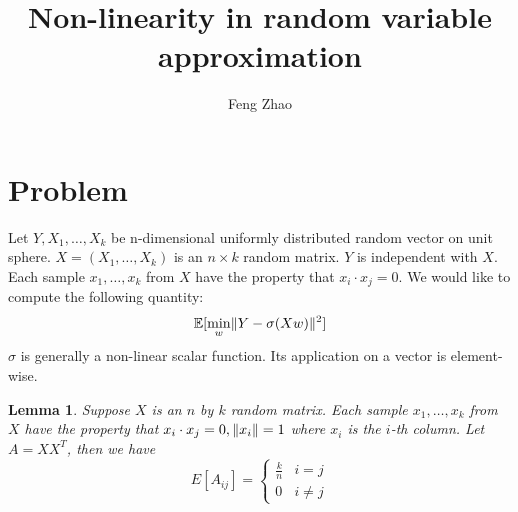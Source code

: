 \documentclass{article}
\title{Non-linearity in random variable approximation}
\author{Feng Zhao}
\DeclarePairedDelimiter\norm{\lVert}{\rVert}
\def\E{\mathbb{E}}
\newtheorem{lemma}{Lemma}
\begin{document}
\maketitle
\section{Problem}
Let $Y, X_1, \dots, X_k$ be n-dimensional uniformly distributed random vector on unit sphere. $X=(X_1, \dots, X_k)$ is an $n\times k$ random matrix. $Y$ is independent with $X$. Each sample $x_1, \dots, x_k$ from $X$ have the property that $x_i \cdot x_j = 0$. We would like to compute the following quantity:
\begin{equation}\label{eq:Eminw}
\E[\min_w \norm{Y - \sigma (X w ) }^2]
\end{equation}
$\sigma$ is generally a non-linear scalar function. Its application on a vector is element-wise.
\begin{lemma}\label{lem:uniform}
Suppose $X$ is an $n$ by $k$ random matrix. Each sample $x_1, \dots, x_k$ from $X$ have the property that $x_i \cdot x_j = 0, \norm{x_i}=1$ where $x_i$ is the $i$-th column.  Let $A=X X^T$, then we have
\begin{equation}
E[A_{ij}]= \begin{cases}
\frac{k}{n} & i = j\\
0 & i\neq j 
\end{cases}
\end{equation}
\end{lemma}
\end{document}
